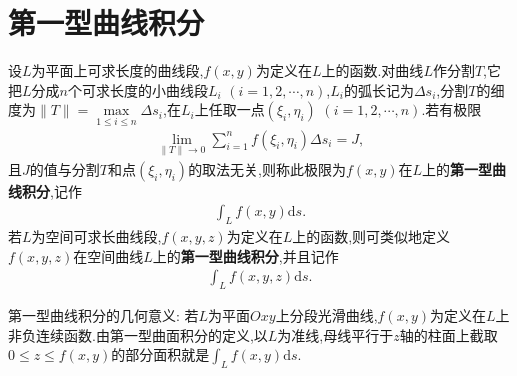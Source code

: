 \documentclass[../../main.tex]{subfiles}%
\begin{document}
\section{第一型曲线积分}

\begin{definition}
设$L$为平面上可求长度的曲线段,$f(x,y)$为定义在$L$上的函数.对曲线$L$作分割$T$,它把$L$分成$n$个可求长度的小曲线段$L_i$ $(i=1,2,\cdots,n)$,$L_i$的弧长记为$\Delta s_i$,分割$T$的细度为$\| T \| = \max\limits_{1 \leqslant i \leqslant n} \Delta s_i$,在$L_i$上任取一点$(\xi_i,\eta_i)$ $(i=1,2,\cdots,n)$.若有极限
\begin{align*}
\lim\limits_{\| T \| \to 0} \sum_{i=1}^n f(\xi_i,\eta_i)\Delta s_i = J,
\end{align*}
且$J$的值与分割$T$和点$(\xi_i,\eta_i)$的取法无关,则称此极限为$f(x,y)$在$L$上的\textbf{第一型曲线积分},记作
\begin{align*}
\int_L f(x,y)\mathrm{d}s.
\end{align*}
若$L$为空间可求长曲线段,$f(x,y,z)$为定义在$L$上的函数,则可类似地定义$f(x,y,z)$在空间曲线$L$上的\textbf{第一型曲线积分},并且记作
\begin{align*}
\int_L f(x,y,z)\mathrm{d}s.
\end{align*}
\end{definition}
\begin{remark}
第一型曲线积分的几何意义:
若$L$为平面$Oxy$上分段光滑曲线,$f(x,y)$为定义在$L$上非负连续函数.由第一型曲面积分的定义,以$L$为准线,母线平行于$z$轴的柱面上截取$0 \leqslant z \leqslant f(x,y)$的部分面积就是$\int_L f(x,y)\mathrm{d}s$.
\end{remark}
\end{document}
